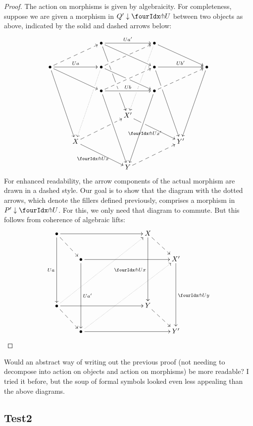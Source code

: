 \documentclass[reqno,10pt,a4paper,oneside]{amsart}
\begin{document}
\begin{proof}
The action on morphisms is given by algebraicity.
For completeness, suppose we are given a morphism in $Q' \downarrow \liftr{U}$ between two objects as above, indicated by the solid and dashed arrows below:
\[
\xymatrix{
&&
  \bullet
  \ar[rr]^{U a'}
  \ar[dddr]|!{[d];[rr]}{\hole}|!{[d];[ddrr]}{\hole}|!{[dd];[drr]}{\hole}|!{[dd];[ddrr]}{\hole}
  \ar[drr]
&&
  \bullet
  \ar@{.>}[dddl]|!{[ll];[d]}{\hole}|!{[d];[ddll]}{\hole}|!{[dll];[dd]}{\hole}|!{[ddll];[dd]}{\hole}
  \ar[drr]
\\
  \bullet
  \ar[rr]^{U a}
  \ar[dddr]
  \ar[drr]
  \ar@{-->}[urr]
&&
  \bullet
  \ar@{.>}[dddl]|!{[ll];[d]}{\hole}
  \ar[drr]|!{[d];[rr]}{\hole}
  \ar@{-->}[urr]|!{[u];[rr]}{\hole}
&&
  \bullet
  \ar[rr]^{U b'}
  \ar[dddr]|!{[d];[rr]}{\hole}
&&
  \bullet
  \ar[dddl]
\\&&
  \bullet
  \ar[rr]^{U b}
  \ar[dddr]
  \ar@{-->}[urr]
&&
  \bullet
  \ar[dddl]
  \ar@{-->}[urr]
\\&&&
  X'
  \ar[drr]_{\liftr{U} x'}|!{[ur];[dd]}{\hole}
\\&
  X
  \ar[drr]_{\liftr{U} x}
  \ar@{-->}[urr]|!{[uur];[drr]}{\hole}
&&&&
  Y'
\\&&&
  Y
  \ar@{-->}[urr]
}
\]
For enhanced readability, the arrow components of the actual morphism are drawn in a dashed style.
Our goal is to show that the diagram with the dotted arrows, which denote the fillers defined previously, comprises a morphism in $P' \downarrow \liftr{U}$.
For this, we only need that diagram to commute.
But this follows from coherence of algebraic lifts:
\[
\xymatrix{
  \bullet
  \ar[ddd]_{U a}
  \ar[rrrr]
  \ar@{-->}[dr]
&&&&
  X
  \ar[ddd]_{\liftr{U} x}
  \ar@{-->}[dr]
\\&
  \bullet
  \ar[ddd]^{U a'}
  \ar[rrrr]
&&&&
  X'
  \ar[ddd]^{\liftr{U} y}
\\\\
  \bullet
  \ar[rrrr]
  \ar@{.>}[uuurrrr]
  \ar@{-->}[dr]
&&&&
  Y
  \ar@{-->}[dr]
\\&
  \bullet
  \ar[rrrr]
  \ar@{.>}[uuurrrr]
&&&&
  Y'
}
\]
\end{proof}

\begin{question}
Would an abstract way of writing out the previous proof (not needing to decompose into action on objects and action on morphisms) be more readable?
I tried it before, but the soup of formal symbols looked even less appealing than the above diagrams.
\end{question}


\subsection{Test2}
\end{document}
